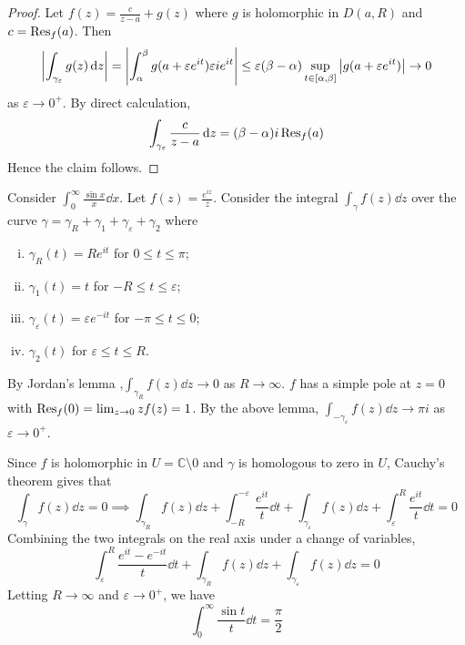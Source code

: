 \begin{proof}
	Let \( f(z) = \frac{c}{z-a} + g(z) \) where \( g \) is holomorphic in \( D(a,R) \) and \( c = \Res_f(a) \).
	Then
	\[ \abs{\int_{\gamma_\varepsilon} g(z) \dd{z}} = \abs{\int_\alpha^\beta g(a+\varepsilon e^{it}) \varepsilon i e^{it}} \leq \varepsilon (\beta - \alpha) \sup_{t \in [\alpha,\beta]} \abs{g(a+\varepsilon e^{it})} \to 0 \]
	as \( \varepsilon \to 0^+ \).
	By direct calculation,
	\[ \int_{\gamma_\varepsilon} \frac{c}{z-a} \dd{z} = (\beta-\alpha)i\Res_f(a) \]
	Hence the claim follows.
\end{proof}
\begin{example}
	Consider \( \int_0^\infty \frac{\sin x}{x} \dd{x} \).
	Let \( f(z) = \frac{e^{iz}}{z} \).
	Consider the integral \( \int_\gamma f(z) \dd{z} \) over the curve \( \gamma = \gamma_R + \gamma_1 + \gamma_\varepsilon + \gamma_2 \) where
	\begin{enumerate}[(i)]
		\item \( \gamma_R(t) = Re^{it} \) for \( 0 \leq t \leq \pi \);
		\item \( \gamma_1(t) = t \) for \( -R \leq t \leq \varepsilon \);
		\item \( \gamma_\varepsilon(t) = \varepsilon e^{-it} \) for \( -\pi \leq t \leq 0 \);
		\item \( \gamma_2(t) \) for \( \varepsilon \leq t \leq R \).
	\end{enumerate}
	By Jordan's lemma ,\( \int_{\gamma_R} f(z) \dd{z} \to 0 \) as \( R \to \infty \).
	\( f \) has a simple pole at \( z = 0 \) with \( \Res_f(0) = \lim_{z \to 0} z f(z) = 1 \).
	By the above lemma, \( \int_{-\gamma_\varepsilon} f(z) \dd{z} \to \pi i \) as \( \varepsilon \to 0^+ \).

	Since \( f \) is holomorphic in \( U = \mathbb C \setminus \qty{0} \) and \( \gamma \) is homologous to zero in \( U \), Cauchy's theorem gives that
	\[ \int_\gamma f(z) \dd{z} = 0 \implies \int_{\gamma_R} f(z) \dd{z} + \int_{-R}^{-\varepsilon} \frac{e^{it}}{t} \dd{t} + \int_{\gamma_\varepsilon} f(z) \dd{z} + \int_{\varepsilon}^R \frac{e^{it}}{t} \dd{t} = 0 \]
	Combining the two integrals on the real axis under a change of variables,
	\[ \int_{\varepsilon}^R \frac{e^{it} - e^{-it}}{t} \dd{t} + \int_{\gamma_R} f(z) \dd{z} + \int_{\gamma_{\varepsilon}} f(z) \dd{z} = 0 \]
	Letting \( R \to \infty \) and \( \varepsilon \to 0^+ \), we have
	\[ \int_0^\infty \frac{\sin t}{t} \dd{t} = \frac{\pi}{2} \]
\end{example}
